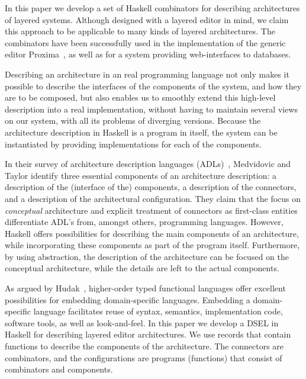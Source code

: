 \documentclass[preprint,natbib]{sigplanconf}
\begin{document}
In this paper we develop a set of Haskell combinators for describing architectures of layered systems. Although designed with a layered editor in mind, we claim this approach to be applicable to many kinds of layered architectures. The combinators have been successfully used in the implementation of the generic editor Proxima~\cite{Schrage04Proxima}, as well as for a system providing web-interfaces to databases. 

Describing an architecture in an real programming language not only makes it possible to describe the interfaces of the components of the system, and how they are to be composed, but also enables us to smoothly extend this high-level description into a real implementation, without having to maintain several views on our system, with all its problems of diverging versions. Because the architecture description in Haskell is a program in itself, the system can be instantiated by providing implementations for each of the components.

In their survey of architecture description languages (ADLs)~\cite{medvidovic00ADLs}, Medvidovic and Taylor identify three essential components of an architecture description: a description of the (interface of the) components, a description of the connectors, and a description of the architectural configuration. They claim that the focus on {\em conceptual} architecture and explicit treatment of connectors as first-class entities differentiate ADL's from, amongst others, programming languages. However, Haskell offers possibilities for describing the main components of an architecture, while incorporating  these components as part of the program itself. Furthermore, by using abstraction, the description of the architecture can be focused on the conceptual architecture, while the details are left to the actual components.

As argued by Hudak~\cite{hudak98DSLs}, higher-order typed functional languages offer excellent possibilities for embedding domain-specific languages. Embedding a domain-specific language facilitates reuse of syntax, semantics, implementation code, software tools, as well as look-and-feel. In this paper we develop a DSEL in Haskell for describing layered editor architectures. We use records that contain functions to describe the components of the architecture. The connectors are combinators, and the configurations are programs (functions) that consist of combinators and components. 
\end{document}
